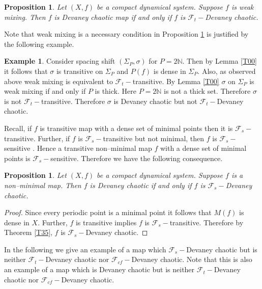 \documentclass{amsart}[12pt, papera4]
\newtheorem{proposition}[theorem]{Proposition}
\theoremstyle{definition}
\newtheorem{example}[theorem]{Example}
\theoremstyle{remark}
\numberwithin{equation}{section}
\def\N{{\mathbb N}}
\def\F{{\mathscr{F}}}
\begin{document}
\smallskip		
\begin{proposition}\label{p3.7}
	Let $(X,f)$ be a compact dynamical system. Suppose $f$ is weak mixing. Then $f$ is Devaney chaotic map if and only if $f$ is $\F_t-$Devaney chaotic.
\end{proposition}

\smallskip
\noindent Note that weak mixing is a necessary condition in Proposition \ref{p3.7} is justified by the following example.

\smallskip		
\begin{example}\label{3.10}
	Consider spacing shift $(\Sigma_P,\sigma)$ for $P=2\N$. Then by Lemma \ref{T00} it follows that $\sigma$ is transitive on $\Sigma_P$ and $P(f)$ is dense in $\Sigma_P$. Also, as observed above weak mixing is equivalent to $\F_t-$transitive. By Lemma \ref{T00} $\sigma$ on $\Sigma_P$ is weak mixing if and only if $P$ is thick. Here $P=2\N$ is not a thick set. Therefore $\sigma$ is not $\F_t-$transitive. Therefore $\sigma$ is Devaney chaotic but not $\F_t-$Devaney chaotic.
\end{example}

\smallskip
\noindent Recall, if $f$ is transitive map with a dense set of minimal points then it is $\F_s-$transitive. Further, if $f$ is $\F_s-$transitive but not minimal, then $f$ is $\F_s-$sensitive \cite{TKS}. Hence a transitive non--minimal map $f$ with a dense set of minimal points is $\F_s-$sensitive. Therefore we have the following consequence.

\begin{proposition}\label{3.9}
	Let $(X,f)$ be a compact dynamical system. Suppose $f$ is a non--minimal map. Then $f$ is Devaney chaotic if and only if $f$ is $\F_s-$Devaney chaotic. 
\end{proposition}

\begin{proof}
	Since every periodic point is a minimal point it follows that $M(f)$ is dense in $X$. Further, $f$ is transitive implies $f$ is $\F_s-$transitive. Therefore by Theorem \ref{T35}, $f$ is $\F_s-$Devaney chaotic. 
\end{proof}


\smallskip 
\noindent In the following we give an example of a map which $\F_s-$Devaney chaotic but is neither $\F_t-$Devaney chaotic nor $\F_{cf}-$Devaney chaotic. Note that this is also an example of a map which is Devaney chaotic but is neither $\F_t-$Devaney chaotic nor $\F_{cf}-$Devaney chaotic.
\end{document}
